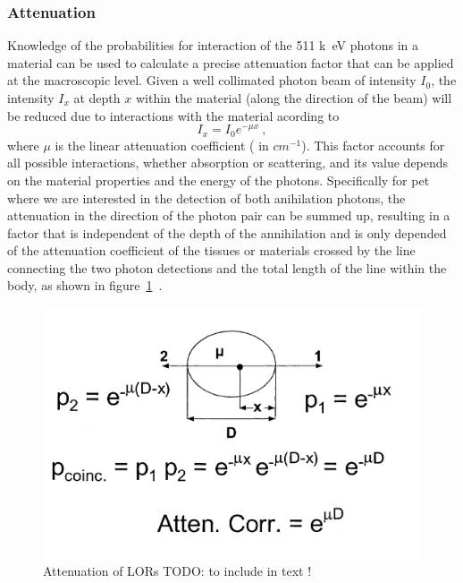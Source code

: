 \subsubsection{Attenuation}
Knowledge of the probabilities for interaction of the 511 \si{k\electronvolt} photons in a material can be used to calculate a precise attenuation factor that can be applied at the macroscopic level. Given a well collimated photon beam of intensity $I_0$, the intensity $I_x$ at depth $x$ within the material (along the direction of the beam) will be reduced due to interactions with the material acording to
\begin{equation} \label{Attenuation}
I_x = I_0 e^{-\mu x} \ ,
\end{equation}
where $\mu$ is the linear attenuation coefficient ( in $cm^{-1}$). This factor accounts for all possible interactions, whether absorption or scattering, and its value depends on the material properties and the energy of the photons.
%
Specifically for \gls{pet} where we are interested in the detection of both anihilation photons, the attenuation in the direction of the photon pair can be summed up, resulting in a factor that is independent of the depth of the annihilation and is only depended of the attenuation coefficient of the tissues or materials crossed by the line connecting the two photon detections and the total length of the line within the body, as shown in figure~\ref{fig_2:511_attenuation}~\cite{Phelps1975}. 

\begin{figure} [h!]
\centering
\includegraphics[scale=0.45,angle=0]{2_Theory_Methods/figures/Phelps_LOR_attenuation_correction.png}
\caption{Attenuation of LORs TODO:  to include in text ! } 
\label{fig_2:511_attenuation}
\end{figure} 

